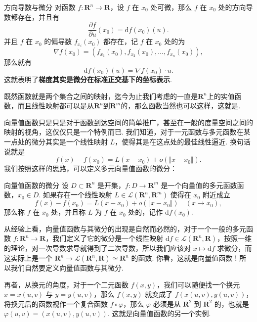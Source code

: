 \begin{theorem}{方向导数与微分}{}
    对函数 $f\colon \mathbf{R}^n\to \mathbf{R}$，设 $f$ 在 $x_0$ 处可微，那么 $f$ 在 $x_0$ 处的方向导数都存在，并且有\[\frac{\partial f}{\partial u}(x_0) = \mathrm{d}f(x_0)(u).\]
    并且 $f$ 在 $x_0$ 的偏导数 $f_{x_i}(x_0)$ 都存在，记 $f$ 在 $x_0$ 处的为 \[\nabla f(x_0) = (f_{x_1}(x_0), f_{x_2}(x_0), \ldots, f_{x_n}(x_0)),\]
    那么就有 \[\mathrm{d}f(x_0)(u) = \nabla f(x_0)\cdot u.\]这就表明了\textbf{梯度其实是微分在标准正交基下的坐标表示}.
\end{theorem}

既然函数就是两个集合之间的映射，迄今为止我们考虑的一直是$\mathbf{R}^n$上的实值函数，而且线性映射都可以是从$\mathbf{R}^n$到$\mathbf{R}^m$的，那么函数当然也可以这样，这就是.

向量值函数只是只是对于函数到达空间的简单推广，甚至在一般的度量空间之间的映射的视角，这仅仅只是一个特例而已. 我们知道，对于一元函数与多元函数在某一点处的微分其实是一个线性映射 $L$，使得其是在这点处的最佳线性逼近. 换句话说就是\[f(x) - f(x_0) = L(x-x_0) + o(\Vert x-x_0\Vert).\]我们按照这样的思路，可以定义多元向量值函数的微分：

\begin{definition}{向量值函数的微分}{}
    设 $D\subset\mathbf{R}^n$ 是开集，$f\colon D\to\mathbf{R}^m$ 是一个向量值的多元函数函数，$x_0\in D$. 如果存在一个线性映射 $L\in \mathcal{L}(\mathbf{R}^n, \mathbf{R}^m)$ 使得在 $x_0$ 附近成立\[f(x) - f(x_0) = L(x-x_0) + o(\Vert x-x_0\Vert)\quad (x\to x_0),\]那么称 $f$ 在 $x_0$ 处，并且称 $L$ 为 $f$ 在 $x_0$ 处的，记作 $\mathrm{d}f(x_0)$.
\end{definition}

从经验上看，向量值函数与其微分的出现是自然而必然的，对于一个一般的多元函数 $f\colon \mathbf{R}^n\to \mathbf{R}$，我们定义了它的微分是一个线性映射 $\mathrm{d}f\in \mathcal{L}(\mathbf{R}^n, \mathbf{R})$，按照一维的理论，对一次导数求导就得到了二次导数，所以我们应该对 $x \mapsto \mathrm{d}f$ 求微分，而这实际上是一个 $\mathbf{R}^n\to \mathcal{L}(\mathbf{R}^n,\mathbf{R})\simeq \mathbf{R}^n$ 的函数. 你看，这就是向量值函数！所以我们自然要定义向量值函数与其微分.

再者，从换元的角度，对于一个二元函数 $f(x, y)$，我们可以随便找一个换元 $x = x(u, v)$ 与 $y = y(u, v)$，那么 $f(x, y)$ 就变成了 $f(x(u, v), y(u, v))$，将换元后的函数视作一个复合函数 $f\circ \varphi$，那么 $\varphi$ 必须是从 $\mathbf{R}^2$ 到 $\mathbf{R}^2$ 的，也就是 $\varphi(u, v) = (x(u, v), y(u, v))$. 这就是向量值函数的另一个实例.

